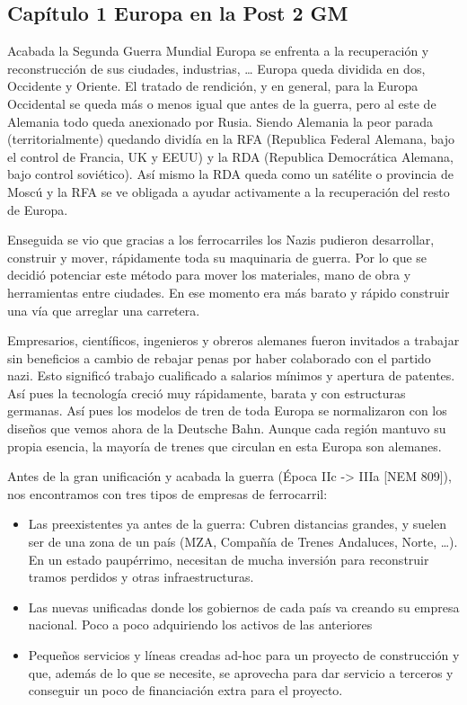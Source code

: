 
\subsection{Capítulo 1 Europa en la Post 2 GM}
Acabada la Segunda Guerra Mundial Europa se enfrenta a la recuperación y reconstrucción
de sus ciudades, industrias, … Europa queda dividida en dos, Occidente y Oriente. El 
tratado de rendición, y en general, para la Europa Occidental se queda más o menos igual
que antes de la guerra, pero al este de Alemania todo queda anexionado por Rusia. Siendo 
Alemania la peor parada (territorialmente) quedando dividía en la RFA (Republica Federal
Alemana, bajo el control de Francia, UK y EEUU) y la RDA (Republica Democrática Alemana,
bajo control soviético).  Así mismo la RDA queda como un satélite o provincia de Moscú
y la RFA se ve obligada a ayudar activamente a la recuperación del resto de Europa. 
 
Enseguida se vio que gracias a los ferrocarriles los Nazis pudieron desarrollar, construir
y mover, rápidamente toda su maquinaria de guerra. Por lo que se decidió potenciar este
método para mover los materiales, mano de obra y herramientas entre ciudades. En ese momento
era más barato y rápido construir una vía que arreglar una carretera. 
 
Empresarios, científicos, ingenieros y obreros alemanes fueron invitados a trabajar sin
beneficios a cambio de rebajar penas por haber colaborado con el partido nazi. Esto significó
trabajo cualificado a salarios mínimos y apertura de patentes. Así pues la tecnología creció
muy rápidamente, barata y con estructuras germanas. Así pues los modelos de tren de toda
Europa se normalizaron con los diseños que vemos ahora de la Deutsche Bahn. Aunque cada región
mantuvo su propia esencia, la mayoría de trenes que circulan en esta Europa son alemanes. 
 
Antes de la gran unificación y acabada la guerra (Época IIc -> IIIa [NEM 809]), nos encontramos
con tres tipos de empresas de ferrocarril:
\begin{itemize}
\item Las preexistentes ya antes de la guerra: Cubren distancias grandes, y suelen ser de una zona
de un país (MZA, Compañía de Trenes Andaluces, Norte, …). En un estado paupérrimo, necesitan
de mucha inversión para reconstruir tramos perdidos y otras infraestructuras.  
\item Las nuevas unificadas donde los gobiernos de cada país va creando su empresa nacional.
 Poco a poco adquiriendo los activos de las anteriores 
\item Pequeños servicios y líneas creadas ad-hoc para un proyecto de construcción y que,
además de lo que se necesite, se aprovecha para dar servicio a terceros y conseguir un poco 
de financiación extra para el proyecto. 
\end{itemize}

